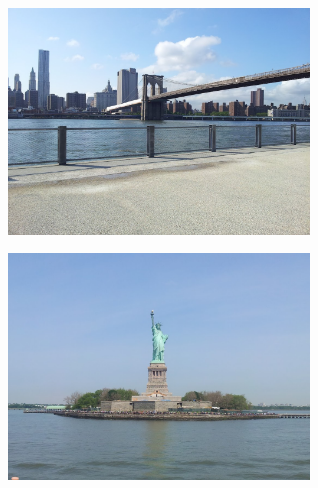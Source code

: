\documentclass[handout]{beamer}
\begin{document}
\begin{frame}
\begin{center}
\includegraphics[width=8cm]{bridge}
\end{center}
\end{frame}
\begin{frame}
\begin{center}
\includegraphics[width=8cm]{liberty}
\end{center}
\end{frame}
\end{document}
